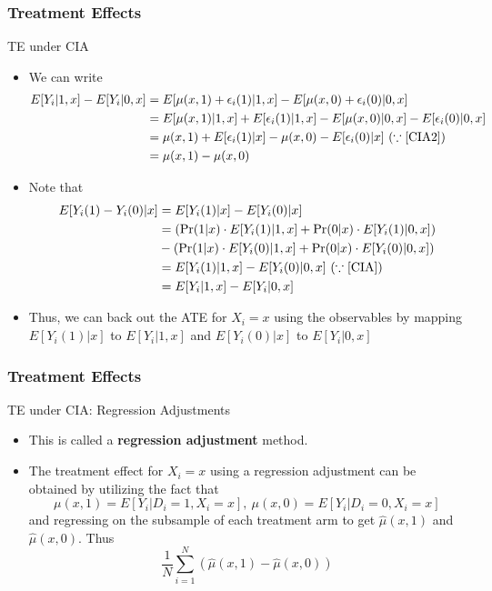 \documentclass{beamer}
\begin{document}
\begin{frame}
\frametitle{Treatment Effects}
TE under CIA
\begin{itemize}
\item We can write
\scriptsize{\begin{align*}
E[Y_i|1, x]-E[Y_i|0, x]&=E[\mu(x,1)+\epsilon_i(1)|1,x]-E[\mu(x,0)+\epsilon_i(0)|0, x]\\
&=E[\mu(x,1)|1, x]+E[\epsilon_i(1)|1, x]-E[\mu(x,0)|0, x]-E[\epsilon_i(0)|0, x]\\
&=\mu(x,1)+E[\epsilon_i(1)|x]-\mu(x,0)-E[\epsilon_i(0)|x] \ (\because \ref{CIA2})\\
&=\mu(x,1)-\mu(x,0)
\end{align*}}\normalsize
\item Note that 
\scriptsize{\begin{align*}
E[Y_i(1)-Y_i(0)|x] &= E[Y_i(1)|x]- E[Y_i(0)|x]\\
&=(\Pr(1|x)\cdot E[Y_i(1)|1,x]+\Pr(0|x)\cdot E[Y_i(1)|0,x])\\
&-(\Pr(1|x)\cdot E[Y_i(0)|1,x]+\Pr(0|x)\cdot E[Y_i(0)|0,x])\\
&=  E[Y_i(1)|1,x]- E[Y_i(0)|0,x] \ (\because \ref{CIA}) \\
&=  E[Y_i|1, x]-E[Y_i|0, x]
\end{align*}}\normalsize
\item Thus, we can back out the ATE for $X_i=x$ using the observables by mapping $ E[Y_i(1)|x]$ to $ E[Y_i|1, x]$ and $E[Y_i(0)|x]$ to $ E[Y_i|0, x]$ 
\end{itemize}
\end{frame}

\begin{frame}
\frametitle{Treatment Effects}
TE under CIA: Regression Adjustments
\begin{itemize}
\item This is called a \textbf{regression adjustment} method. 
\item The treatment effect for $X_i=x$ using a regression adjustment can be obtained by utilizing the fact that 
\[
\mu(x,1)=E[Y_i|D_i=1, X_i=x], \ \mu(x,0)=E[Y_i|D_i=0, X_i=x]
\]
and regressing on the subsample of each treatment arm to get $\hat{\mu}(x,1)$ and $\hat{\mu}(x,0)$. Thus
\[
\frac{1}{N}\sum_{i=1}^N(\hat{\mu}(x,1)-\hat{\mu}(x,0))
\]
\end{itemize}
\end{frame}
\end{document}
